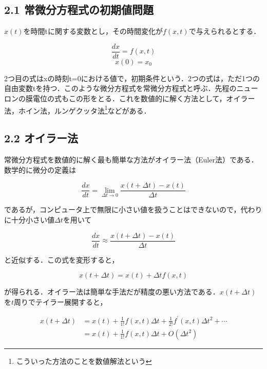 \documentclass[dvipdfmx, A4j, twocolumn, 10.5pt]{jsarticle}
\begin{document}
\subsection*{2.1 常微分方程式の初期値問題}
$x(t)$を時間tに関する変数とし，その時間変化が$f(x, t)$で与えられるとする．

\begin{equation}
  \frac{dx}{dt} = f(x, t)
\end{equation}
\begin{equation}
  x(0) = x_0
\end{equation}


2つ目の式はxの時刻t=0における値で，初期条件という．2つの式は，ただ1つの自由変数tを持つ．このような微分方程式を常微分方程式と呼ぶ．先程のニューロンの膜電位の式もこの形をとる．これを数値的に解く方法として，オイラー法，ホイン法，ルンゲクッタ法\footnote{こういった方法のことを数値解法という}などがある．

\subsection*{2.2 オイラー法}
常微分方程式を数値的に解く最も簡単な方法がオイラー法（Euler法）である．数学的に微分の定義は

\begin{equation}
  \frac{dx}{dt} = \lim_{\Delta t \to 0} \frac{x(t + \Delta t) - x(t)}{\Delta t}
\end{equation}

であるが，コンピュータ上で無限に小さい値を扱うことはできないので，代わりに十分小さい値$\Delta t$を用いて

\begin{equation}
  \frac{dx}{dt} \approx \frac{x(t + \Delta t) - x(t)}{\Delta t}
\end{equation}


と近似する．この式を変形すると，

\begin{equation}
 x(t+\Delta t)=x(t)+\Delta t f(x, t)
\end{equation}


が得られる．オイラー法は簡単な手法だが精度の悪い方法である．$x(t+\Delta t)$を$t$周りでテイラー展開すると，

$$
\begin{aligned}
x(t+\Delta t) & =x(t)+\frac{1}{1!} f(x, t) \Delta t+\frac{1}{2!} f^{\prime}(x, t) \Delta t^2+\cdots \\
& =x(t)+\frac{1}{1!} f(x, t) \Delta t+O\left(\Delta t^2\right)
\end{aligned}
$$
\end{document}
